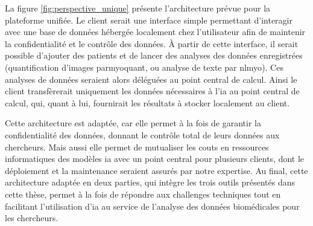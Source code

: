 La figure \ref{fig:perspective_unique} présente l'architecture prévue pour la plateforme unifiée. Le client serait une interface simple permettant d'interagir avec une base de données hébergée localement chez l'utilisateur afin de maintenir la confidentialité et le contrôle des données. À partir de cette interface, il serait possible d'ajouter des patients et de lancer des analyses des données enregistrées (quantification d'images par\gls{myoquant}, ou analyse de texte par \gls{nlmyo}). Ces analyses de données seraient alors déléguées au point central de calcul. Ainsi le client transfèrerait uniquement les données nécessaires à l'\gls{ia} au point central de calcul, qui, quant à lui, fournirait les résultats à stocker localement au client.

Cette architecture est adaptée, car elle permet à la fois de garantir la confidentialité des données, donnant le contrôle total de leurs données aux chercheurs. Mais aussi elle permet de mutualiser les couts en ressources informatiques des modèles \gls{ia} avec un point central pour plusieurs clients, dont le déploiement et la maintenance seraient assurés par notre expertise. Au final, cette architecture adaptée en deux parties, qui intègre les trois outils présentés dans cette thèse, permet à la fois de répondre aux challenges techniques tout en facilitant l'utilisation d'\gls{ia} au service de l'analyse des données biomédicales pour les chercheurs.
